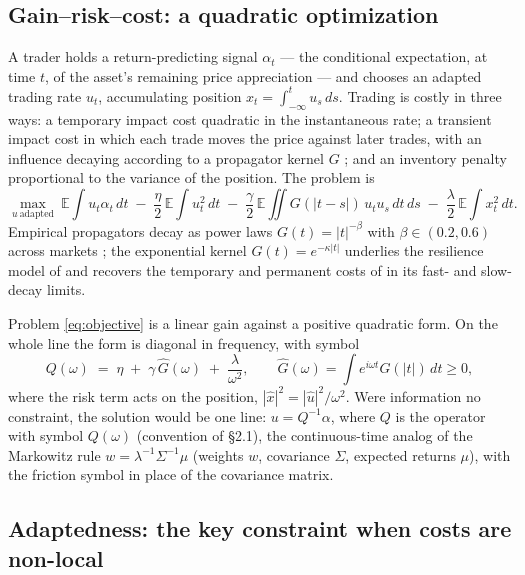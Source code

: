 \documentclass[11pt]{article}
\newcommand{\E}{\mathbb{E}}
\theoremstyle{plain}
\begin{document}
\subsection{Gain--risk--cost: a quadratic optimization}

A trader holds a return-predicting signal $\alpha_t$ --- the conditional expectation, at time $t$, of the asset's remaining price appreciation --- and chooses an adapted trading rate $u_t$, accumulating position $x_t = \int_{-\infty}^t u_s\,ds$. Trading is costly in three ways: a temporary impact cost quadratic in the instantaneous rate; a transient impact cost in which each trade moves the price against later trades, with an influence decaying according to a propagator kernel $G$ \citep{BouchaudGefenPottersWyart2004,Gatheral2010}; and an inventory penalty proportional to the variance of the position. The problem is
\begin{equation}\label{eq:objective}
\max_{u\ \text{adapted}}\ \E\!\int u_t\alpha_t\,dt
\;-\; \frac{\eta}{2}\,\E\!\int u_t^2\,dt
\;-\; \frac{\gamma}{2}\,\E\!\iint G(|t-s|)\,u_t u_s\,dt\,ds
\;-\; \frac{\lambda}{2}\,\E\!\int x_t^2\,dt .
\end{equation}
Empirical propagators decay as power laws $G(t) = |t|^{-\beta}$ with $\beta\in(0.2,0.6)$ across markets \citep{BouchaudGefenPottersWyart2004,JusselinRosenbaum2020}; the exponential kernel $G(t)=e^{-\kappa|t|}$ underlies the resilience model of \citet{ObizhaevaWang2013} and recovers the temporary and permanent costs of \citet{AlmgrenChriss2001} in its fast- and slow-decay limits.

Problem \eqref{eq:objective} is a linear gain against a positive quadratic form. On the whole line the form is diagonal in frequency, with symbol
\begin{equation}\label{eq:symbol}
Q(\omega) \;=\; \eta \;+\; \gamma\,\hat G(\omega) \;+\; \frac{\lambda}{\omega^2},
\qquad \hat G(\omega) = \int e^{i\omega t}G(|t|)\,dt \ge 0,
\end{equation}
where the risk term acts on the position, $|\hat x|^2 = |\hat u|^2/\omega^2$. Were information no constraint, the solution would be one line: $u = Q^{-1}\alpha$, where $Q$ is the operator with symbol $Q(\omega)$ (convention of \S2.1), the continuous-time analog of the Markowitz rule $w = \lambda^{-1}\Sigma^{-1}\mu$ (weights $w$, covariance $\Sigma$, expected returns $\mu$), with the friction symbol in place of the covariance matrix.

\subsection{Adaptedness: the key constraint when costs are non-local}
\end{document}
